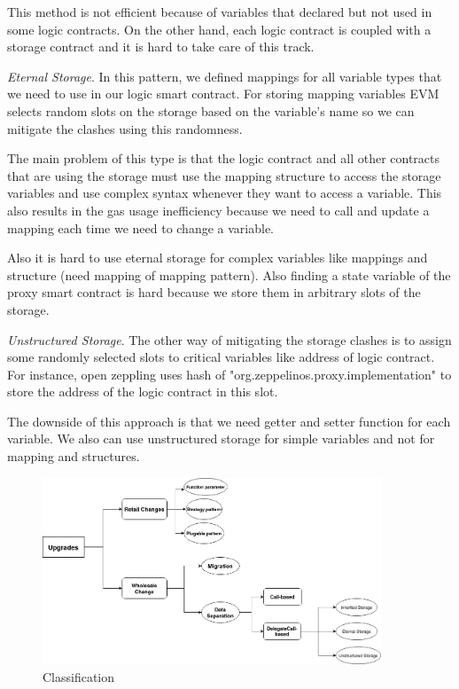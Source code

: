 This method is not efficient because of variables that declared but not used in some logic contracts. On the other hand, each logic contract is coupled with a storage contract and it is hard to take care of this track. 

\textit{Eternal Storage}. 
In this pattern, we defined mappings for all variable types that we need to use in our logic smart contract. For storing mapping variables EVM selects random slots on the storage based on the variable's name so we can mitigate the clashes using this randomness.

The main problem of this type is that the logic contract and all other contracts that are using the storage must use the mapping structure to access the storage variables and use complex syntax whenever they want to access a variable. This also results in the gas usage inefficiency because we need to call and update a mapping each time we need to change a variable.  

Also it is hard to use eternal storage for complex variables like mappings and structure (need mapping of mapping pattern). Also finding a state variable of the proxy smart contract is hard because we store them in arbitrary slots of the storage.

\textit{Unstructured Storage}. 
The other way of mitigating the storage clashes is to assign some randomly selected slots to critical variables like address of logic contract. For instance, open zeppling uses hash of "org.zeppelinos.proxy.implementation" to store the address of the logic contract in this slot.

The downside of this approach is that we need getter and setter function for each variable. We also can use unstructured storage for simple variables and not for mapping and structures.



\begin{figure}
  \centering
    
      \includegraphics[width=0.9\textwidth]{figures/Chart.png}
  \caption{Classification}
 \end{figure}

